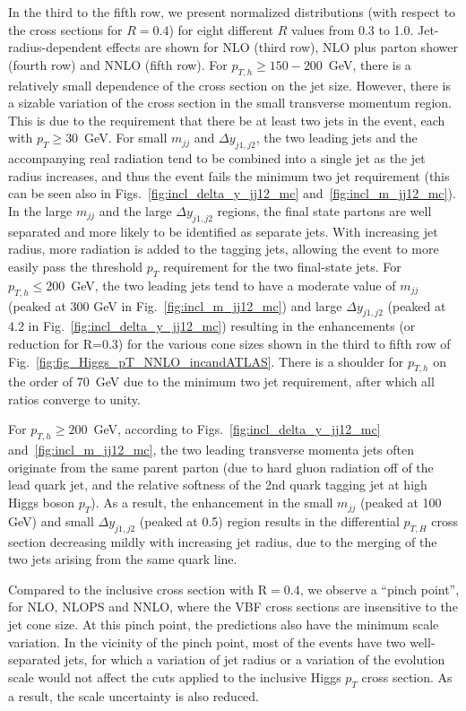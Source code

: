 \documentclass[10pt,prd,fleqn,superscriptaddress,notitlepage,nofootinbib,preprintnumbers,nobalancelastpage]{revtex4-1}
\newcommand{\VBF}{VBF\xspace}
\begin{document}
In the third to the fifth row, we present  normalized distributions (with respect to the cross sections for $R=0.4$) for eight different $R$ values from 0.3 to 1.0.  Jet-radius-dependent effects are shown for NLO (third row), NLO plus parton shower (fourth row) and NNLO (fifth row). For $p_{T,h}\ge 150-200$~GeV, there is a relatively small dependence of the cross section on the jet size. However, there is a sizable variation of the cross section in the small transverse momentum region. This is due to the requirement that there be at least two jets  in the event, each with $p_T \ge 30$~GeV.
For small $m_{jj}$ and  $\Delta  y_{j1,j2}$, the two leading jets and the accompanying real radiation tend to be combined into a single jet as the jet radius increases, and thus the event fails the minimum two jet requirement (this can be seen also in Figs.~\ref{fig:incl_delta_y_jj12_mc} and~\ref{fig:incl_m_jj12_mc}). In the large $m_{jj}$ and the large $\Delta y_{j1,j2}$ regions, the final state partons are well separated and more likely to be identified as separate jets.
With increasing jet radius, more radiation is added to the tagging jets, allowing the event to more easily pass the threshold $p_T$ requirement for the two final-state jets.
For $p_{T,h}\le 200$~GeV, the two leading jets tend to have
a moderate value of  $m_{jj}$ (peaked at 300 GeV in Fig.~\ref{fig:incl_m_jj12_mc}) and large $\Delta  y_{j1,j2}$ (peaked at 4.2 in Fig.~\ref{fig:incl_delta_y_jj12_mc}) resulting in the enhancements (or reduction for R=0.3) for the various cone sizes shown in the third to fifth row of Fig.~\ref{fig:fig_Higgs_pT_NNLO_incandATLAS}.
There is a shoulder for $p_{T,h}$ on the order of 70~GeV due to the minimum two jet requirement, after which all ratios converge to unity.

For $p_{T,h}\ge 200$~GeV, according to Figs.~\ref{fig:incl_delta_y_jj12_mc} and~\ref{fig:incl_m_jj12_mc}, the two leading  transverse momenta jets often originate from the same parent parton (due to hard gluon radiation off of the lead quark jet, and the relative softness of the 2nd quark tagging jet at high Higgs boson $p_T$).  As a result, the enhancement in the small $m_{jj}$ (peaked at 100 GeV) and small $\Delta y_{j1,j2}$ (peaked at 0.5) region results in the  differential $p_{T,H}$ cross section  decreasing mildly with increasing jet radius, due to the merging of the two jets arising from the same quark line.

Compared to the inclusive cross section with R$=0.4$, we observe a ``pinch point'', for NLO, NLOPS and NNLO, where the \VBF cross sections are insensitive to the  jet cone size. At this pinch point,  the predictions also have the minimum scale variation. In the vicinity of the pinch point, most of the events have two well-separated jets, for which a  variation of jet radius or a variation of the evolution scale would not affect the cuts applied to the inclusive Higgs $p_T$ cross section.
As a result, the scale uncertainty is also reduced.
\end{document}
